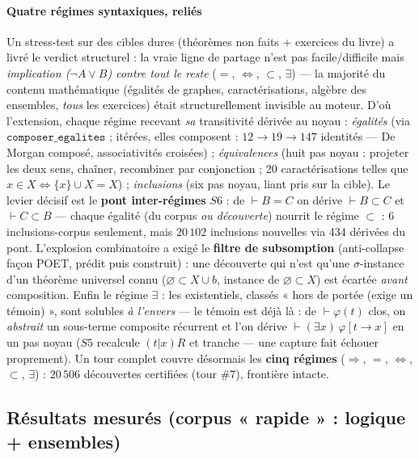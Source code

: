 \paragraph{Quatre régimes syntaxiques, reliés} Un stress-test sur des cibles dures
(théorèmes non faits + exercices du livre) a livré le verdict structurel : la vraie
ligne de partage n'est pas facile/difficile mais \emph{implication
($\neg A\vee B$) contre tout le reste} ($=$, $\Leftrightarrow$, $\subset$,
$\exists$) --- la majorité du contenu mathématique (égalités de graphes,
caractérisations, algèbre des ensembles, \emph{tous} les exercices) était
structurellement invisible au moteur. D'où l'extension, chaque régime recevant
\emph{sa} transitivité dérivée au noyau : \emph{égalités} (via
$\texttt{composer\_egalites}$ ; itérées, elles composent : $12\to19\to147$
identités --- De Morgan composé, associativités croisées) ; \emph{équivalences}
(huit pas noyau : projeter les deux sens, chaîner, recombiner par conjonction ;
20 caractérisations telles que $x\in X \Leftrightarrow \{x\}\cup X=X$) ;
\emph{inclusions} (six pas noyau, liant pris sur la cible). Le levier décisif est
le \textbf{pont inter-régimes} $S6$ : de $\vdash B=C$ on dérive $\vdash B\subset C$
et $\vdash C\subset B$ --- chaque égalité (du corpus \emph{ou découverte}) nourrit
le régime $\subset$ : 6 inclusions-corpus seulement, mais $20\,102$ inclusions
nouvelles via 434 dérivées du pont. L'explosion combinatoire a exigé le
\textbf{filtre de subsomption} (anti-collapse façon POET, prédit puis construit) :
une découverte qui n'est qu'une $\sigma$-instance d'un théorème universel connu
($\varnothing\subset X\cup b$, instance de $\varnothing\subset X$) est écartée
\emph{avant} composition. Enfin le régime $\exists$ : les existentiels, classés
« hors de portée (exige un témoin) », sont solubles \emph{à l'envers} --- le témoin
est déjà là : de $\vdash\varphi(t)$ clos, on \emph{abstrait} un sous-terme composite
récurrent et l'on dérive $\vdash(\exists x)\,\varphi[t{\to}x]$ en un pas noyau
($S5$ recalcule $(t|x)R$ et tranche --- une capture fait échouer proprement).
Un tour complet couvre désormais les \textbf{cinq régimes} ($\Rightarrow$, $=$,
$\Leftrightarrow$, $\subset$, $\exists$) : $20\,506$ découvertes certifiées
(tour \#7), frontière intacte.

\subsection{Résultats mesurés (corpus « rapide » : logique + ensembles)}

